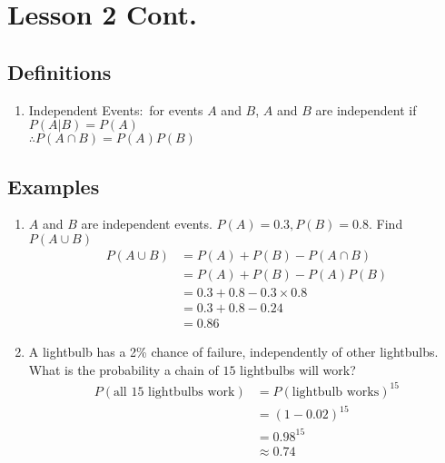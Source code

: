 \documentclass[12pt]{article}
\begin{document}
        \section{Lesson 2 Cont.}
            \subsection{Definitions}
                \begin{enumerate}
                    \item Independent Events:\ for events $A$ and $B$, $A$ and $B$ are independent if $P(A|B) = P(A)$ \\
                    $\therefore P(A \cap B) = P(A)P(B)$
                \end{enumerate}
            \subsection{Examples}
                \begin{enumerate}
                    \item $A$ and $B$ are independent events. $P(A) = 0.3, P(B) = 0.8$. Find $P(A \cup B)$
                    \begin{align*}
                        P(A \cup B) &= P(A) + P(B) - P(A \cap B)\\
                        &= P(A) + P(B) - P(A)P(B)\\
                        &= 0.3 + 0.8 - 0.3 \times 0.8\\
                        &= 0.3 + 0.8 - 0.24\\
                        &= 0.86
                    \end{align*}
                    \item A lightbulb has a 2\% chance of failure, independently of other lightbulbs. What is the probability a chain of $15$ lightbulbs will work?
                    \begin{align*}
                        P(\text{all }15\text{ lightbulbs work}) &= P{(\text{lightbulb works})}^{15}\\
                        &= {(1 - 0.02)}^{15}\\
                        &= 0.98^{15}\\
                        &\approx 0.74
                    \end{align*}
                \end{enumerate}
\end{document}
